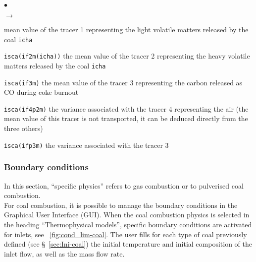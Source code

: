 {{{\begin{list}{$\bullet$}{}
\begin{list}{$\rightarrow$}{}
\begin{list}{}{}
                                       mean value of the tracer 1 representing
                                       the light volatile matters released by
                                       the coal \texttt{icha}
                                  \item
                                       \texttt{isca(if2m(icha))} the
                                        mean value of the tracer 2 representing
                                        the heavy volatile matters released by
                                        the coal \texttt{icha}
                                  \item \texttt{isca(if3m)}
                                        the mean value of the tracer 3
                                        representing the carbon released
                                        as CO during coke burnout
                                  \item \texttt{isca(if4p2m)} the
                                  variance associated with the tracer 4
                                  representing the air (the mean value of this
                                  tracer is not transported, it can be deduced
                                  directly from the three others)
                                  \item \texttt{isca(ifp3m)} the
                                  variance associated with the tracer 3
                           \end{list}
              \end{list}
\end{list}

\subsubsection{Boundary conditions}\label{sec:coal-cl}
In this section, ``specific physics'' refers to gas combustion or
to pulverised coal combustion.\\
For coal combustion, it is possible to manage the boundary conditions in the Graphical User Interface (GUI). When the coal combustion physics is selected in the heading ``Thermophysical models'', specific boundary conditions are activated for inlets, see \figurename~\ref{fig:cond_lim-coal}. The user fills for each type of coal previously defined (see \S~\ref{sec:Ini-coal}) the initial temperature and initial composition of the inlet flow, as well as the mass flow rate.

}}}
